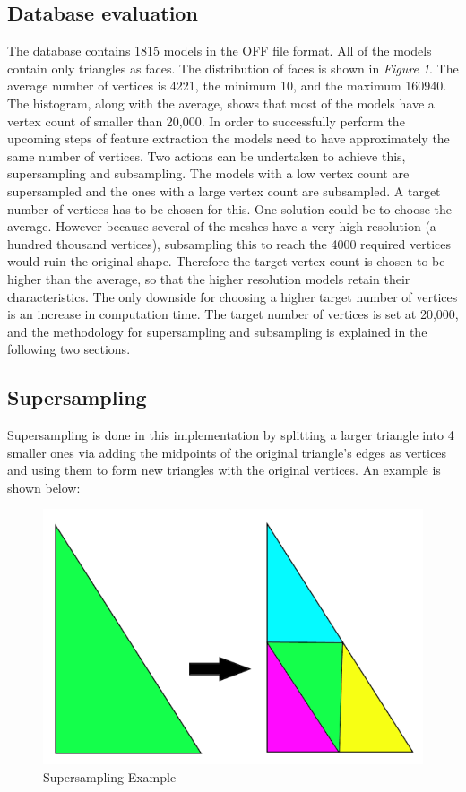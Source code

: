 \documentclass{bigdata}
\begin{document}
\subsection{Database evaluation}

The database contains 1815 models in the OFF file format. All of the models contain only triangles as faces. The distribution of faces is shown in \textit{Figure 1}. The average number of vertices is 4221, the minimum 10, and the maximum 160940. The histogram, along with the average, shows that most of the models have a vertex count of smaller than 20,000. In order to successfully perform the upcoming steps of feature extraction the models need to have approximately the same number of vertices. Two actions can be undertaken to achieve this, supersampling and subsampling. The models with a low vertex count are supersampled and the ones with a large vertex count are subsampled. A target number of vertices has to be chosen for this. One solution could be to choose the average. However because several of the meshes have a very high resolution (a hundred thousand vertices), subsampling this to reach the 4000 required vertices would ruin the original shape. Therefore the target vertex count is chosen to be higher than the average, so that the higher resolution models retain their characteristics. The only downside for choosing a higher target number of vertices is an increase in computation time. The target number of vertices is set at 20,000, and the methodology for supersampling and subsampling is explained in the following two sections.

\subsection{Supersampling}
Supersampling is done in this implementation by splitting a larger triangle into 4 smaller ones via adding the midpoints of the original triangle’s edges as vertices and using them to form new triangles with the original vertices. An example is shown below:

\begin{figure}[h!]
  \centering
  \includegraphics[width=0.5\linewidth]{Pictures/triangle.png}
  \caption{Supersampling Example}
\end{figure}
\end{document}
